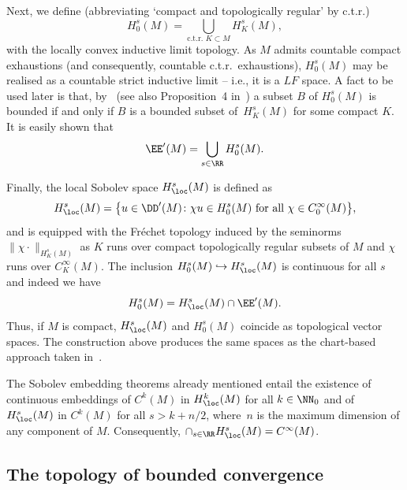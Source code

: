  Next, we define (abbreviating `compact and topologically regular' by c.t.r.)
 \begin{equation*}
 	H_0^s(M) = \bigcup_{\text{c.t.r. $K\subset M$}} H^s_K(M),
 \end{equation*}
 with the locally convex inductive limit topology.
 As $M$ admits countable compact exhaustions (and consequently, countable c.t.r.\ exhaustions), $H_0^s(M)$ may be realised as a countable strict inductive limit -- i.e., it is a $LF$ space. A fact to be used later is that, by~\cite[Proposition~14.6]{Treves:TVS} (see also Proposition~4 in~\cite{DieudonneSchwartz:1949}) a subset $B$ of $H_0^s(M)$ is bounded if and only if $B$ is a bounded subset of~$H^s_K(M)$ for some compact $K$. It is easily shown that
 \begin{equation*}
 	\EE'(M) = \bigcup_{s\in\RR} H_0^{s}(M).
 \end{equation*}






 Finally, the local Sobolev space $H^s_\loc(M)$ is defined as
 \begin{equation*}
 	H^s_\loc(M) = \big\{u\in\DD'(M)\colon \text{$\chi u\in H^s_0(M)$ for all $\chi\in C_0^\infty({M})$}\big\},
 \end{equation*}
 and is equipped with the Fr\'echet topology induced by the seminorms $\|\chi \cdot\|_{H^s_{K}(M)}$ as $K$ runs over compact topologically regular subsets of $M$ and $\chi$ runs over $C^\infty_K(M)$. The inclusion
 $H^s_0(M)\hookrightarrow H^s_\loc(M)$ is continuous for all $s$ and indeed we have
 \begin{equation*}
 	H^s_0(M) = H^s_\loc(M) \cap \EE'(M).
 \end{equation*}
 Thus, if $M$ is compact, $H^s_\loc(M)$ and $H^s_0(M)$ coincide as topological vector spaces. The construction above produces the same spaces as the chart-based approach taken in~\cite{Hormander3}.

 The Sobolev embedding theorems already mentioned entail the existence of continuous embeddings of $C^k(M)$ in $H^k_\loc(M)$ for all $k\in\NN_0$ and of $H^s_\loc(M)$ in $C^k(M)$ for all $s>k+n/2$, where~$n$ is the maximum dimension of any component of $M$. Consequently, $\cap_{s\in\RR} H^s_\loc(M)=C^\infty(M)$.

 \subsection{The topology of bounded convergence}\label{appx:top_bded_cvgnce}

